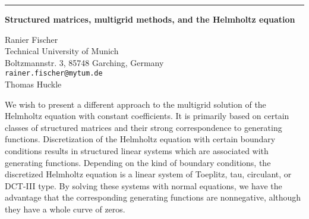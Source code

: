 \documentclass[twosided]{report}
\begin{document}
	\begin{center} \rule{6in}{1pt} \end{center}

\begin{center}
{\large			%
{\bf Structured matrices, multigrid methods, and the Helmholtz equation}}

	Ranier Fischer \\
	Technical University of Munich \\
	Boltzmannstr. 3, 85748 Garching, Germany \\
	{\tt rainer.fischer@mytum.de} \\
	Thomas Huckle
\end{center}
We wish to present a different approach to the multigrid
solution of the Helmholtz equation with constant
coefficients. It is primarily based on certain classes of
structured matrices and their strong correspondence to
generating functions. Discretization of the Helmholtz
equation with certain boundary conditions results in
structured linear systems which are associated with
generating functions. Depending on the kind of boundary
conditions, the discretized Helmholtz equation is a linear
system of Toeplitz, tau, circulant, or DCT-III type. By
solving these systems with normal equations, we have the
advantage that the corresponding generating functions are
nonnegative, although they have a whole curve of zeros.
\end{document}
